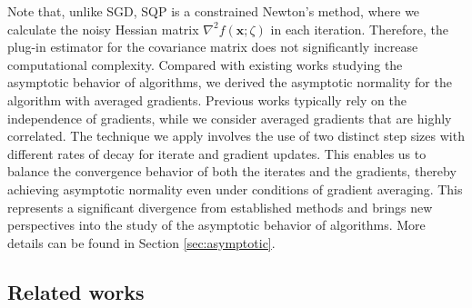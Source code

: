 \documentclass[aos]{imsart}
\numberwithin{equation}{section}
\theoremstyle{plain}
\begin{document}
Note that, unlike SGD, SQP is a constrained Newton's method, where we calculate the noisy Hessian matrix $\nabla^2 f(\bm{x};\zeta)$ in each iteration. Therefore, the plug-in estimator for the covariance matrix does not significantly increase computational complexity. Compared with existing works studying the asymptotic behavior of algorithms, we derived the asymptotic normality for the algorithm with averaged gradients. Previous works typically rely on the independence of gradients, while we consider averaged gradients that are highly correlated.
The technique we apply involves the use of two distinct step sizes with different rates of decay for iterate and gradient updates. This enables us to balance the convergence behavior of both the iterates and the gradients, thereby achieving asymptotic normality even under conditions of gradient averaging.
This represents a significant divergence from established methods and brings new perspectives into the study of the asymptotic behavior of algorithms. More details can be found in Section \ref{sec:asymptotic}.



\subsection{Related works}
\label{intro:related_works}
\end{document}
